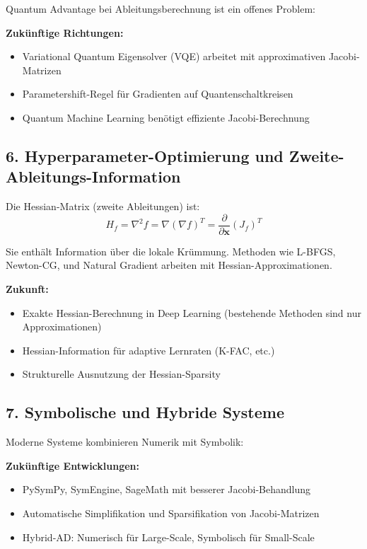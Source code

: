 ﻿\documentclass[a4paper,12pt]{article}
\theoremstyle{definition}
\begin{document}
Quantum Advantage bei Ableitungsberechnung ist ein offenes Problem:

\textbf{Zukünftige Richtungen:}
\begin{itemize}
	\item Variational Quantum Eigensolver (VQE) arbeitet mit approximativen Jacobi-Matrizen
	\item Parametershift-Regel für Gradienten auf Quantenschaltkreisen
	\item Quantum Machine Learning benötigt effiziente Jacobi-Berechnung
\end{itemize}

\subsection{6. Hyperparameter-Optimierung und Zweite-Ableitungs-Information}

Die Hessian-Matrix (zweite Ableitungen) ist:
\[
H_f = \nabla^2 f = \nabla(\nabla f)^T = \frac{\partial}{\partial \boldsymbol{x}}(J_f)^T
\]

Sie enthält Information über die lokale Krümmung. Methoden wie L-BFGS, Newton-CG, und Natural Gradient arbeiten mit Hessian-Approximationen.

\textbf{Zukunft:}
\begin{itemize}
	\item Exakte Hessian-Berechnung in Deep Learning (bestehende Methoden sind nur Approximationen)
	\item Hessian-Information für adaptive Lernraten (K-FAC, etc.)
	\item Strukturelle Ausnutzung der Hessian-Sparsity
\end{itemize}

\subsection{7. Symbolische und Hybride Systeme}

Moderne Systeme kombinieren Numerik mit Symbolik:

\textbf{Zukünftige Entwicklungen:}
\begin{itemize}
	\item PySymPy, SymEngine, SageMath mit besserer Jacobi-Behandlung
	\item Automatische Simplifikation und Sparsifikation von Jacobi-Matrizen
	\item Hybrid-AD: Numerisch für Large-Scale, Symbolisch für Small-Scale
\end{itemize}
\end{document}
